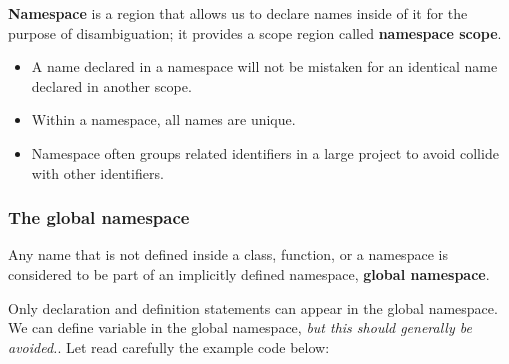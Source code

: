 \documentclass[
  letterpaper,
  DIV=11,
  numbers=noendperiod]{scrreprt}
\providecommand{\tightlist}{%
  \setlength{\itemsep}{0pt}\setlength{\parskip}{0pt}}\usepackage{longtable,booktabs,array}
\begin{document}
\textbf{Namespace} is a region that allows us to declare names inside of
it for the purpose of disambiguation; it provides a scope region called
\textbf{namespace scope}.

\begin{tcolorbox}[enhanced jigsaw, toprule=.15mm, rightrule=.15mm, opacityback=0, breakable, leftrule=.75mm, colback=white, colframe=quarto-callout-note-color-frame, arc=.35mm, left=2mm, bottomrule=.15mm]
\begin{minipage}[t]{5.5mm}
\textcolor{quarto-callout-note-color}{\faInfo}
\end{minipage}%
\begin{minipage}[t]{\textwidth - 5.5mm}

\begin{itemize}
\tightlist
\item
  A name declared in a namespace will not be mistaken for an identical
  name declared in another scope.
\item
  Within a namespace, all names are unique.
\item
  Namespace often groups related identifiers in a large project to avoid
  collide with other identifiers.
\end{itemize}

\end{minipage}%
\end{tcolorbox}

\hypertarget{the-global-namespace}{%
\subsubsection{The global namespace}\label{the-global-namespace}}

Any name that is not defined inside a class, function, or a namespace is
considered to be part of an implicitly defined namespace, \textbf{global
namespace}.

Only declaration and definition statements can appear in the global
namespace. We can define variable in the global namespace, \emph{but
this should generally be avoided.}. Let read carefully the example code
below:
\end{document}
